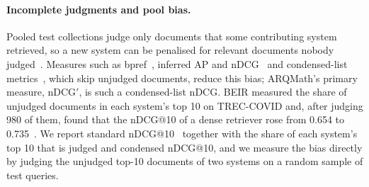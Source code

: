 \paragraph{Incomplete judgments and pool bias.}
Pooled test collections judge only documents that some contributing system retrieved, so a new system can be penalised for relevant documents nobody judged~\citep{zobel1998reliable,buckley2007bias}. Measures such as bpref~\citep{buckley2004bpref}, inferred AP and nDCG~\citep{yilmaz2006infap,yilmaz2008infndcg} and condensed-list metrics~\citep{sakai2007alternatives,sakai2008incomplete}, which skip unjudged documents, reduce this bias; ARQMath's primary measure, nDCG$'$, is such a condensed-list nDCG. BEIR measured the share of unjudged documents in each system's top 10 on TREC-COVID and, after judging 980 of them, found that the nDCG@10 of a dense retriever rose from 0.654 to 0.735~\citep{thakur2021beir}. We report standard nDCG@10~\citep{jarvelin2002ndcg} together with the share of each system's top 10 that is judged and condensed nDCG@10, and we measure the bias directly by judging the unjudged top-10 documents of two systems on a random sample of test queries.

